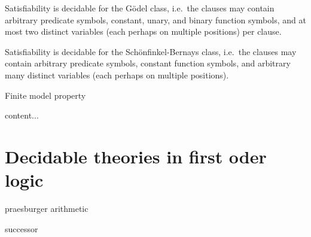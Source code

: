 \begin{lemma}\label{lem:goedel}
	Satisfiability is decidable for the Gödel class, 
	i.e.~the clauses
	may contain arbitrary predicate symbols, 
	constant, unary, and binary function symbols, 
	and at most two distinct variables 
	(each perhaps on multiple positions) per clause.
	
\end{lemma}


\begin{lemma}\label{lem:schoenfinkel}
	Satisfiability is decidable for the Schönfinkel-Bernays class, 
	i.e.~the clauses
	may contain arbitrary predicate symbols, 
	constant function symbols, 
	and arbitrary many distinct variables 
	(each perhaps on multiple positions).
	
\end{lemma}

\begin{lemma}
\end{lemma}





\begin{definition}Finite model property
\end{definition}


\begin{theorem}
	content...
\end{theorem}



\section{Decidable theories in first oder logic}

praesburger arithmetic

successor



